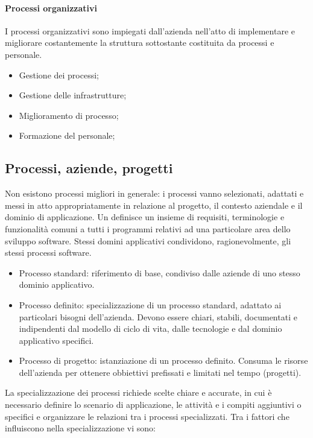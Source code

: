 \paragraph{Processi organizzativi}

I processi organizzativi sono impiegati dall'azienda nell'atto di implementare e
migliorare costantemente la struttura sottostante costituita da processi e
personale.

\begin{itemize}
	\item Gestione dei processi;
	\item Gestione delle infrastrutture;
	\item Miglioramento di processo;
	\item Formazione del personale;
\end{itemize}

\subsection{Processi, aziende, progetti}

Non esistono processi migliori in generale: i processi vanno selezionati,
adattati e messi in atto appropriatamente in relazione al progetto, il contesto
aziendale e il dominio di applicazione. Un 
definisce un insieme di requisiti, terminologie e funzionalità comuni a tutti i
programmi relativi ad una particolare area dello sviluppo software. Stessi
domini applicativi condividono, ragionevolmente, gli stessi processi software.

\begin{itemize}
  \item Processo standard: riferimento di base, condiviso dalle aziende di uno
    stesso dominio applicativo.
  \item Processo definito: specializzazione di un processo standard, adattato ai
    particolari bisogni dell'azienda. Devono essere chiari, stabili, documentati
    e indipendenti dal modello di ciclo di vita, dalle tecnologie e dal dominio
    applicativo specifici.
  \item Processo di progetto: istanziazione di un processo definito. Consuma le
    risorse dell'azienda per ottenere obbiettivi prefissati e limitati nel tempo
    (progetti).
\end{itemize}

La specializzazione dei processi richiede scelte chiare e accurate, in cui è
necessario definire lo scenario di applicazione, le attività e i compiti
aggiuntivi o specifici e organizzare le relazioni tra i processi specializzati.
Tra i fattori che influiscono nella specializzazione vi sono:

